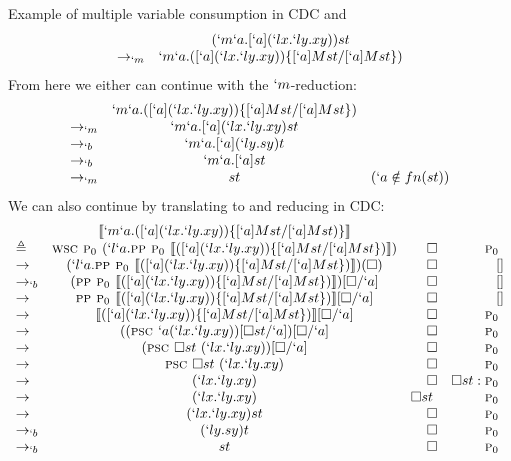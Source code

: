 \begin{example}{Example of multiple variable consumption in CDC and \lmu}
\[
\begin{array}{lcrr}
         & (`m`a.[`a](`lx.`ly.xy))st \\
\to_{`m} & `m`a.([`a](`lx.`ly.xy))\{[`a]Mst/[`a]Mst\}) \\
\end{array}
\]
From here we either can continue with the $`m$-reduction:
\[
\begin{array}{lcrr}
         & `m`a.([`a](`lx.`ly.xy))\{[`a]Mst/[`a]Mst\}) \\
\to_{`m} & `m`a.[`a](`lx.`ly.xy)st \\
\to_{`b} & `m`a.[`a](`ly.sy)t \\
\to_{`b} & `m`a.[`a]st \\
\to_{`m} & st & (`a \notin fn(st)) \\
\end{array}
\]
We can also continue by translating to and reducing in CDC:
{
\[
\begin{array}{lcrr}
           & \llbracket `m`a.([`a](`lx.`ly.xy))\{[`a]Mst/[`a]Mst)\} \rrbracket \\
\triangleq & \textsc{wsc } \textsc{p$_0$ } (`l`a.\textsc{pp } \textsc{p$_0$ } \llbracket ([`a](`lx.`ly.xy))\{[`a]Mst/[`a]Mst\}) \rrbracket) & \square & \textsc{p$_0$ } \\
\to        & (`l`a.\textsc{pp } \textsc{p$_0$ } \llbracket ([`a](`lx.`ly.xy))\{[`a]Mst/[`a]Mst\}) \rrbracket)(\square) & \square & [] \\
\to_{`b}   & (\textsc{pp } \textsc{p$_0$ } \llbracket ([`a](`lx.`ly.xy))\{[`a]Mst/[`a]Mst\}) \rrbracket)[\square/`a] & \square & [] \\
\to        & \textsc{pp } \textsc{p$_0$ } \llbracket ([`a](`lx.`ly.xy))\{[`a]Mst/[`a]Mst\}) \rrbracket[\square/`a] & \square & [] \\
\to        & \llbracket ([`a](`lx.`ly.xy))\{[`a]Mst/[`a]Mst\}) \rrbracket[\square/`a] & \square & \textsc{p$_0$ } \\
\to        & ((\textsc{psc } `a (`lx.`ly.xy))[\square st/`a])[\square/`a] & \square & \textsc{p$_0$ } \\
\to        & (\textsc{psc } \square st\ (`lx.`ly.xy))[\square/`a] & \square & \textsc{p$_0$ } \\
\to        & \textsc{psc } \square st\ (`lx.`ly.xy) & \square & \textsc{p$_0$ } \\
\to        & (`lx.`ly.xy)   & \square & \square st:\textsc{p$_0$ } \\
\to        & (`lx.`ly.xy)   & \square st\ & \textsc{p$_0$ } \\
\to        & (`lx.`ly.xy)st & \square & \textsc{p$_0$ } \\
\to_{`b}   & (`ly.sy)t & \square & \textsc{p$_0$ } \\
\to_{`b}   & st & \square & \textsc{p$_0$ } \\
\end{array}
\]
}
\end{example}

